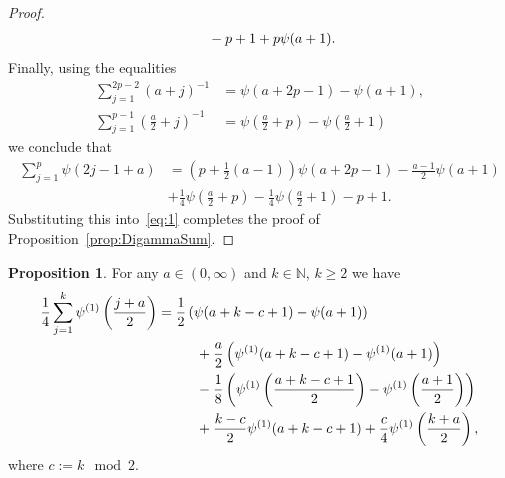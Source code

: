 \documentclass[10pt]{amsart}
\theoremstyle{definition}\newtheorem{defi}[theo]{Definition}\newtheorem{rema}[theo]{Remark}\newtheorem{exam}[theo]{Example}\newtheorem{exem}[theo]{Example}\newtheorem{nota}[theo]{Notation}
\newcommand{\N}{\mathbb{N}}
\newtheorem{proposition}[theo]{Proposition}
\begin{document}
\begin{proof}
\begin{align*}
&\mkern50mu -p+1+p\psi(a+1).
\end{align*}
Finally, using the equalities
\begin{align*}
\sum\limits_{j=1}^{2p-2}(a+j)^{-1}&=\psi(a+2p-1)-\psi(a+1),\\
\sum\limits_{j=1}^{p-1}\left(\frac{a}{2}+j\right)^{-1}&=\psi\left(\frac{a}{2}+p\right)-\psi\left(\frac{a}{2}+1\right)
\end{align*}
we conclude that
\begin{align*}
\sum\limits_{j=1}^p\psi(2j-1+a)&=\left(p+\frac{1}{2}(a-1)\right)\psi (a+2p-1)-\frac{a-1}{2}\psi(a+1)\\
&+\frac{1}{4}\psi\left(\frac{a}{2}+p\right)-\frac{1}{4}\psi\left(\frac{a}{2}+1\right)-p +1.
\end{align*}
Substituting this into~\eqref{eq:1} completes the proof of Proposition~\ref{prop:DigammaSum}.
\end{proof}


\begin{proposition}\label{prop:DerivativeDigammaSum}
For any $a\in(0,\infty)$ and $k\in\N$, $k\ge 2$ we have
\begin{align*}
\frac14\sum\limits_{j=1}^k\psi^{(1)}\left(\frac{j+a}{2}\right)&=\frac{1}{2}\left(\psi(a+k-c+1)-\psi(a+1)\right)\\
&\mkern50mu +\frac{a}{2}\left(\psi^{(1)}(a+k-c+1)-\psi^{(1)}(a+1)\right)\\
&\mkern50mu -\frac{1}{8}\left(\psi^{(1)}\left(\frac{a+k-c+1}{2}\right)-\psi^{(1)}\left(\frac{a+1}{2}\right)\right)\\
&\mkern50mu +\frac{k-c}{2}\psi^{(1)}(a+k-c+1)+\frac{c}{4}\psi^{(1)}\left(\frac{k+a}{2}\right),
\end{align*}
where $c:= k\mod 2$.
\end{proposition}
\end{document}

